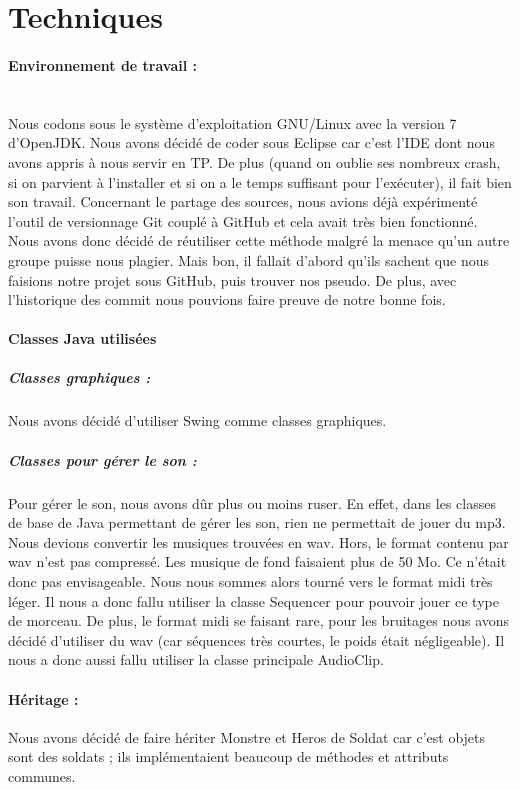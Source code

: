 \documentclass{report}
\begin{document}

\section{Techniques}
\paragraph{Environnement de travail :}
~\\
Nous codons sous le système d'exploitation GNU/Linux avec la version 7 d'OpenJDK.
Nous avons décidé de coder sous Eclipse car c'est l'IDE dont nous avons appris à nous servir en TP. De plus (quand on oublie ses nombreux crash, si on parvient à l'installer et si on a le temps suffisant pour l'exécuter), il fait bien son travail.
Concernant le partage des sources, nous avions déjà expérimenté l'outil de versionnage Git couplé à GitHub et cela avait très bien fonctionné. 
Nous avons donc décidé de réutiliser cette méthode malgré la menace qu'un autre groupe puisse nous plagier. Mais bon, il fallait d'abord qu'ils sachent que nous faisions notre projet sous GitHub, puis trouver nos pseudo. 
De plus, avec l'historique des commit nous pouvions faire preuve de notre bonne fois.


\paragraph{Classes Java utilisées}
  \subparagraph{Classes graphiques :} Nous avons décidé d'utiliser Swing comme classes graphiques. %
  
  \subparagraph{Classes pour gérer le son :} Pour gérer le son, nous avons dûr plus ou moins ruser. 
  En effet, dans les classes de base de Java permettant de gérer les son, rien ne permettait de jouer du mp3. 
  Nous devions convertir les musiques trouvées en wav. Hors, le format contenu par wav n'est pas compressé. 
  Les musique de fond faisaient plus de 50 Mo. Ce n'était donc pas envisageable. 
  Nous nous sommes alors tourné vers le format midi très léger. Il nous a donc fallu utiliser la classe Sequencer pour pouvoir jouer ce type de morceau.
  De plus, le format midi se faisant rare, pour les bruitages nous avons décidé d'utiliser du wav (car séquences très courtes, le poids était négligeable).
  Il nous a donc aussi fallu utiliser la classe principale AudioClip.

\paragraph{Héritage :}  
Nous avons décidé de faire hériter Monstre et Heros de Soldat car c'est objets sont des soldats ; ils implémentaient beaucoup de méthodes et attributs communes. 
\end{document}
